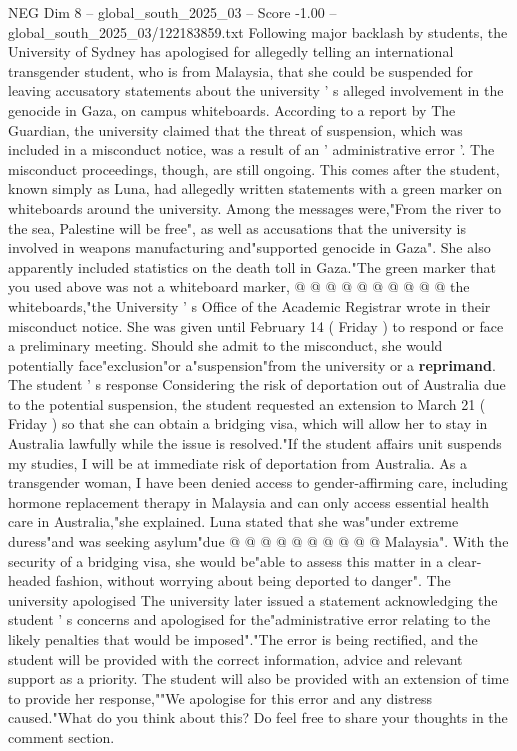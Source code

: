 \begin{textsample}{NEG Dim 8 – global\_south\_2025\_03 – Score -1.00 – global\_south\_2025\_03/122183859.txt}  \label{ex:f8_neg_301}
Following major backlash by students, the University of Sydney has apologised for allegedly telling an international transgender student, who is from Malaysia, that she could be suspended for leaving accusatory statements about the university ' s alleged involvement in the genocide in Gaza, on campus whiteboards.
According to a report by The Guardian, the university claimed that the threat of suspension, which was included in a misconduct notice, was a result of an ' administrative error '.
The misconduct proceedings, though, are still ongoing.
This comes after the student, known simply as Luna, had allegedly written statements with a green marker on whiteboards around the university.
Among the messages were,"From the river to the sea, Palestine will be free", as well as accusations that the university is involved in weapons manufacturing and"supported genocide in Gaza".
She also apparently included statistics on the death toll in Gaza."The green marker that you used above was not a whiteboard marker, @ @ @ @ @ @ @ @ @ @ the whiteboards,"the University ' s Office of the Academic Registrar wrote in their misconduct notice.
She was given until February 14 ( Friday ) to respond or face a preliminary meeting.
Should she admit to the misconduct, she would potentially face"exclusion"or a"suspension"from the university or a \textbf{reprimand}.
The student ' s response Considering the risk of deportation out of Australia due to the potential suspension, the student requested an extension to March 21 ( Friday ) so that she can obtain a bridging visa, which will allow her to stay in Australia lawfully while the issue is resolved."If the student affairs unit suspends my studies, I will be at immediate risk of deportation from Australia.
As a transgender woman, I have been denied access to gender-affirming care, including hormone replacement therapy in Malaysia and can only access essential health care in Australia,"she explained.
Luna stated that she was"under extreme duress"and was seeking asylum"due @ @ @ @ @ @ @ @ @ @ Malaysia".
With the security of a bridging visa, she would be"able to assess this matter in a clear-headed fashion, without worrying about being deported to danger".
The university apologised The university later issued a statement acknowledging the student ' s concerns and apologised for the"administrative error relating to the likely penalties that would be imposed"."The error is being rectified, and the student will be provided with the correct information, advice and relevant support as a priority.
The student will also be provided with an extension of time to provide her response,""We apologise for this error and any distress caused."What do you think about this?
Do feel free to share your thoughts in the comment section.

\end{textsample}
